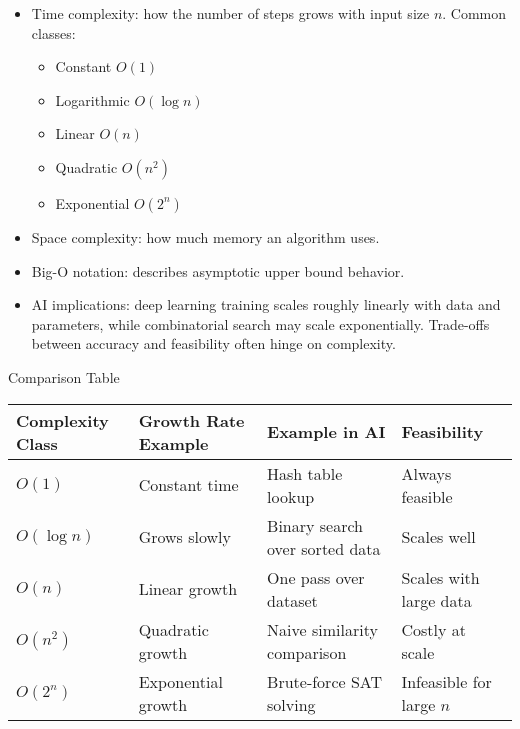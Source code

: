 \documentclass[
  letterpaper,
  DIV=11,
  numbers=noendperiod]{scrreprt}
\providecommand{\tightlist}{%
  \setlength{\itemsep}{0pt}\setlength{\parskip}{0pt}}
\begin{document}
\begin{itemize}
\item
  Time complexity: how the number of steps grows with input size \(n\).
  Common classes:

  \begin{itemize}
  \tightlist
  \item
    Constant \(O(1)\)
  \item
    Logarithmic \(O(\log n)\)
  \item
    Linear \(O(n)\)
  \item
    Quadratic \(O(n^2)\)
  \item
    Exponential \(O(2^n)\)
  \end{itemize}
\item
  Space complexity: how much memory an algorithm uses.
\item
  Big-O notation: describes asymptotic upper bound behavior.
\item
  AI implications: deep learning training scales roughly linearly with
  data and parameters, while combinatorial search may scale
  exponentially. Trade-offs between accuracy and feasibility often hinge
  on complexity.
\end{itemize}

Comparison Table

\begin{longtable}[]{@{}
  >{\raggedright\arraybackslash}p{}
  >{\raggedright\arraybackslash}p{}
  >{\raggedright\arraybackslash}p{}
  >{\raggedright\arraybackslash}p{}@{}}
\toprule\noalign{}
\begin{minipage}[b]{\linewidth}\raggedright
Complexity Class
\end{minipage} & \begin{minipage}[b]{\linewidth}\raggedright
Growth Rate Example
\end{minipage} & \begin{minipage}[b]{\linewidth}\raggedright
Example in AI
\end{minipage} & \begin{minipage}[b]{\linewidth}\raggedright
Feasibility
\end{minipage} \\
\midrule\noalign{}
\endhead
\bottomrule\noalign{}
\endlastfoot
\(O(1)\) & Constant time & Hash table lookup & Always feasible \\
\(O(\log n)\) & Grows slowly & Binary search over sorted data & Scales
well \\
\(O(n)\) & Linear growth & One pass over dataset & Scales with large
data \\
\(O(n^2)\) & Quadratic growth & Naive similarity comparison & Costly at
scale \\
\(O(2^n)\) & Exponential growth & Brute-force SAT solving & Infeasible
for large \(n\) \\
\end{longtable}
\end{document}
